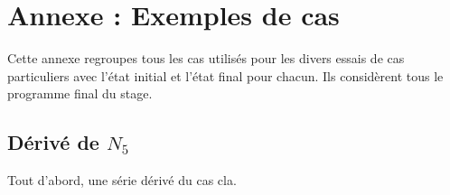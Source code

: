 \chapter{Annexe : Exemples de cas}

\setcounter{section}{0}

Cette annexe regroupes tous les cas utilisés pour les divers essais de cas particuliers avec l'état initial et l'état final pour chacun. Ils considèrent tous le programme final du stage.

\section{Dérivé de $N_5$}

Tout d'abord, une série dérivé du cas cla.

